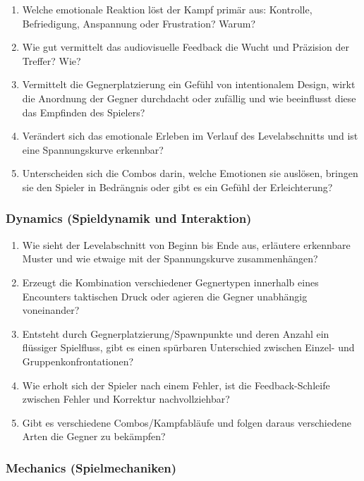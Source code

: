 \documentclass[../Main.tex]{subfiles}
\begin{document}
\begin{enumerate}[label=\textbf{A\arabic*}, leftmargin=1.5cm, itemsep=0.5em]
    \item Welche emotionale Reaktion löst der Kampf primär aus: Kontrolle, Befriedigung, Anspannung oder Frustration? Warum?
    \item Wie gut vermittelt das audiovisuelle Feedback die Wucht und Präzision der Treffer? Wie?
    \item Vermittelt die Gegnerplatzierung ein Gefühl von intentionalem Design, wirkt die Anordnung der Gegner durchdacht oder zufällig und wie beeinflusst diese das Empfinden des Spielers?
    \item Verändert sich das emotionale Erleben im Verlauf des Levelabschnitts und ist eine Spannungskurve erkennbar?
    \item Unterscheiden sich die Combos darin, welche Emotionen sie auslösen, bringen sie den Spieler in Bedrängnis oder gibt es ein Gefühl der Erleichterung?
\end{enumerate}

\subsubsection{Dynamics (Spieldynamik und Interaktion)}

\begin{enumerate}[label=\textbf{D\arabic*}, leftmargin=1.5cm, itemsep=0.5em]
    \item Wie sieht der Levelabschnitt von Beginn bis Ende aus, erläutere erkennbare Muster und wie etwaige mit der Spannungskurve zusammenhängen?
    \item Erzeugt die Kombination verschiedener Gegnertypen innerhalb eines Encounters taktischen Druck oder agieren die Gegner unabhängig voneinander?
    \item Entsteht durch Gegnerplatzierung/Spawnpunkte und deren Anzahl ein flüssiger Spielfluss, gibt es einen spürbaren Unterschied zwischen Einzel- und Gruppenkonfrontationen?
    \item Wie erholt sich der Spieler nach einem Fehler, ist die Feedback-Schleife zwischen Fehler und Korrektur nachvollziehbar?
    \item Gibt es verschiedene Combos/Kampfabläufe und folgen daraus verschiedene Arten die Gegner zu bekämpfen?
\end{enumerate}

\subsubsection{Mechanics (Spielmechaniken)}
\end{document}

